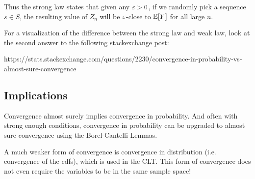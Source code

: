 Thus the strong law states that given any $\varepsilon > 0$, if we randomly pick a sequence $s \in S$, the resulting value of $Z_n$ will be $\varepsilon$-close to ${\mathbb E}[Y]$ for all large $n$.

For a visualization of the difference between the strong law and weak law, look at the second answer to the following stackexchange post:
\begin{center}
   https://stats.stackexchange.com/questions/2230/convergence-in-probability-vs-almost-sure-convergence
\end{center}

\subsection*{Implications}
Convergence almost surely implies convergence in probability. And often with strong enough conditions, convergence in probability can be upgraded to almost sure convergence using the Borel-Cantelli Lemmas.

A much weaker form of convergence is convergence in distribution (i.e. convergence of the cdfs), which is used in the CLT. This form of convergence does not even require the variables to be in the same sample space!

